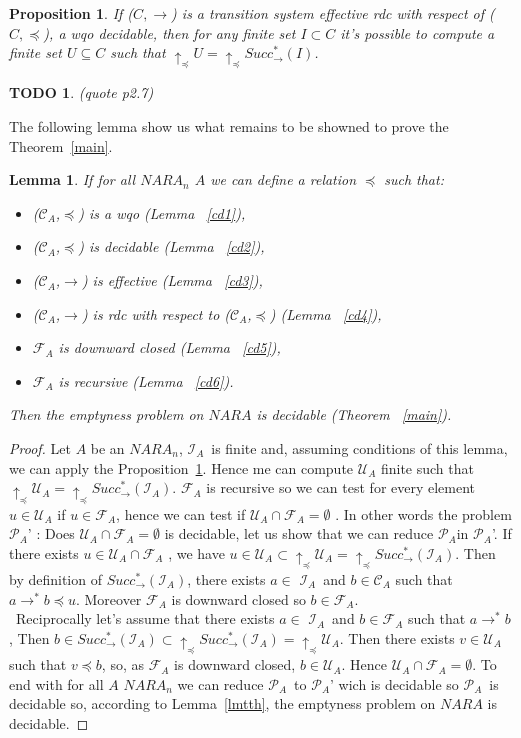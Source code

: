 \documentclass[a4paper,10pt]{report}
\newtheorem{lm}{Lemma}[thr]
\newtheorem{pp}{Proposition}
\newtheorem{td}{TODO}
\newcommand{\C}{\mathcal{C}_{A}}
\newcommand{\I}{\mathcal{I}_{A}}
\newcommand{\F}{\mathcal{F}_{A}}
\newcommand{\U}{\mathcal{U}_{A}}
\newcommand{\pb}{$\mathcal{P}_{A}$}
\begin{document}
\begin{pp} 
  \label{pp}
  If  ($C,\rightarrow$) is a transition system effective rdc with respect of ($C,\preceq$), a wqo decidable, then for any finite set $I\subset C$ it's possible to compute a finite set $U \subseteq C$ such that
  $\uparrow_\preceq U=\uparrow_\preceq Succ^*_\rightarrow (I)$.
\end{pp}

\begin{td}
  (quote p2.7)
\end{td}

The following lemma show us what remains to be showned to prove the Theorem~\ref{main}.
\begin{lm}
    \label{mlm}
    If for all $NARA_n$ $A$ we can define a relation $\preceq$ such that: 
     \begin{itemize}
	\item ($\C$,$\preceq$) is a wqo (Lemma ~\ref{cd1}),
	\item ($\C$,$\preceq$) is decidable (Lemma ~\ref{cd2}),
	\item ($\C$,$\rightarrow$) is effective (Lemma ~\ref{cd3}),
	\item ($\C$,$\rightarrow$) is rdc with respect to ($\C$,$\preceq$) (Lemma ~\ref{cd4}),
	\item $\F$ is downward closed (Lemma ~\ref{cd5}),
	\item $\F$ is recursive (Lemma ~\ref{cd6}).
     \end{itemize}
      Then the emptyness problem on $NARA$ is decidable (Theorem ~\ref{main}).
\end{lm}

\begin{proof}
  Let $A$ be an $NARA_n$,
  $\I$\ is finite and, assuming conditions of this lemma, we can apply the Proposition~\ref{pp}.
  Hence me can compute $\U$ finite such that $\uparrow_\preceq \U=\uparrow_\preceq Succ^*_\rightarrow (\I)$.
  $\F$ is recursive so we can test for every element $u \in \U$ if $u \in\F$, hence we can test if $\U \cap\F=\emptyset$ . 
  In other words the problem \pb' : Does $\U \cap \F =\emptyset$ is decidable, let us show that we can reduce \pb in \pb'.  
  If there exists $u \in \U \cap \F$ , we have $u\in \U \subset \uparrow_\preceq  \U =\uparrow_\preceq Succ^*_\rightarrow (\I)$. 
  Then by definition of $Succ^*_\rightarrow (\I)$, there exists $a\in$ $\I$\ and $b \in\C$ such that $a \rightarrow^* b \preceq u$.
  Moreover $\F$ is downward closed so $b \in \F$.\\\
  Reciprocally let's assume that there exists $a\in$ $\I$\ and $b \in\F$ such that $a \rightarrow^* b $,
  Then $b \in  Succ^*_\rightarrow (\I) \subset \uparrow_\preceq Succ^*_\rightarrow (\I)=\uparrow_\preceq  \U$. 
  Then there exists $v \in \U$ such that $v \preceq b$, so, as $\F$ is downward closed, $b \in \U$. Hence $\U \cap \F =\emptyset$.
  To end with for all $A$  $NARA_n$ we can reduce \pb\ to \pb' wich is decidable so \pb\ is decidable so, according to Lemma~\ref{lmtth},  the emptyness problem on $NARA$ is decidable.
\end{proof}
\end{document}
